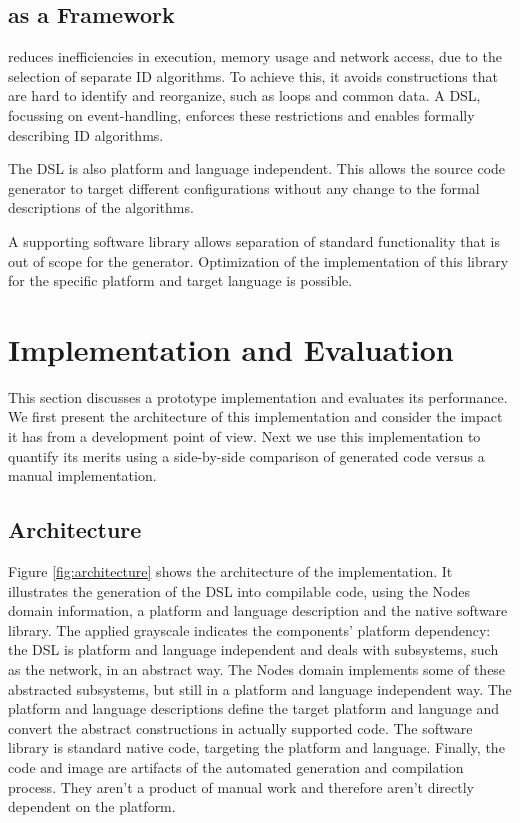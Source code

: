 \documentclass[conference]{IEEEtran}
\begin{document}
\subsection{\NAME as a Framework}

\NAME reduces inefficiencies in execution, memory usage and network access, due
to the selection of separate ID algorithms. To achieve this, it avoids
constructions that are hard to identify and reorganize, such as loops and
common data. A DSL, focussing on event-handling, enforces these restrictions
and enables formally describing ID algorithms.

The DSL is also platform and language independent. This allows the source code
generator to target different configurations without any change to the formal
descriptions of the algorithms.

A supporting software library allows separation of standard functionality that
is out of scope for the generator. Optimization of the implementation of this
library for the specific platform and target language is possible.

\section{Implementation and Evaluation}
\label{evaluation}

This section discusses a prototype implementation and evaluates its
performance. We first present the architecture of this implementation and
consider the impact it has from a development point of view. Next we use this
implementation to quantify its merits using a side-by-side comparison of
generated code versus a manual implementation.

\subsection{Architecture}

Figure \ref{fig:architecture} shows the architecture of the implementation. It
illustrates the generation of the DSL into compilable code, using the Nodes
domain information, a platform and language description and the native software
library. The applied grayscale indicates the components' platform dependency:
the DSL is platform and language independent and deals with subsystems, such as
the network, in an abstract way. The Nodes domain implements some of these
abstracted subsystems, but still in a platform and language independent way.
The platform and language descriptions define the target platform and language
and convert the abstract constructions in actually supported code. The software
library is standard native code, targeting the platform and language. Finally,
the code and image are artifacts of the automated generation and compilation
process. They aren't a product of manual work and therefore aren't directly
dependent on the platform.
\end{document}
